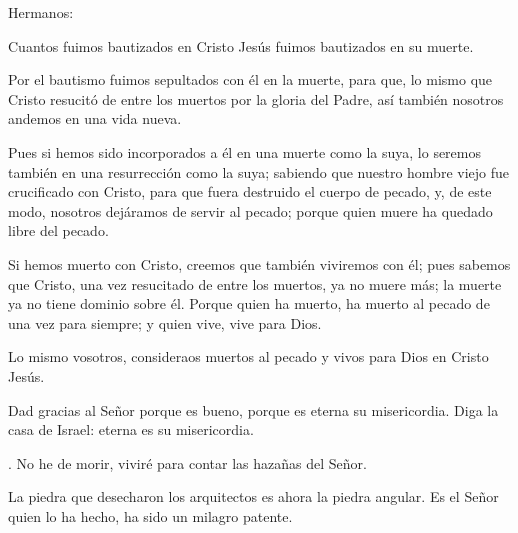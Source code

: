 


\begin{scripture}
Hermanos: 

Cuantos fuimos bautizados en Cristo Jesús fuimos bautizados en su muerte. 

Por el bautismo fuimos sepultados con él en la muerte, para que, lo mismo que Cristo resucitó de entre los muertos por la gloria del Padre, así también nosotros andemos en una vida nueva. 

Pues si hemos sido incorporados a él en una muerte como la suya, lo seremos también en una resurrección como la suya; sabiendo que nuestro hombre viejo fue crucificado con Cristo, para que fuera destruido el cuerpo de pecado, y, de este modo, nosotros dejáramos de servir al pecado; porque quien muere ha quedado libre del pecado. 

Si hemos muerto con Cristo, creemos que también viviremos con él; pues sabemos que Cristo, una vez resucitado de entre los muertos, ya no muere más; la muerte ya no tiene dominio sobre él. Porque quien ha muerto, ha muerto al pecado de una vez para siempre; y quien vive, vive para Dios. 

Lo mismo vosotros, consideraos muertos al pecado y vivos para Dios en Cristo Jesús.
\end{scripture}


 


\begin{psbody}
Dad gracias al Señor porque es bueno, 
porque es eterna su misericordia. 
Diga la casa de Israel: 
eterna es su misericordia. 

. 
No he de morir, viviré 
para contar las hazañas del Señor. 

La piedra que desecharon los arquitectos 
es ahora la piedra angular. 
Es el Señor quien lo ha hecho, 
ha sido un milagro patente. 
\end{psbody}


 

